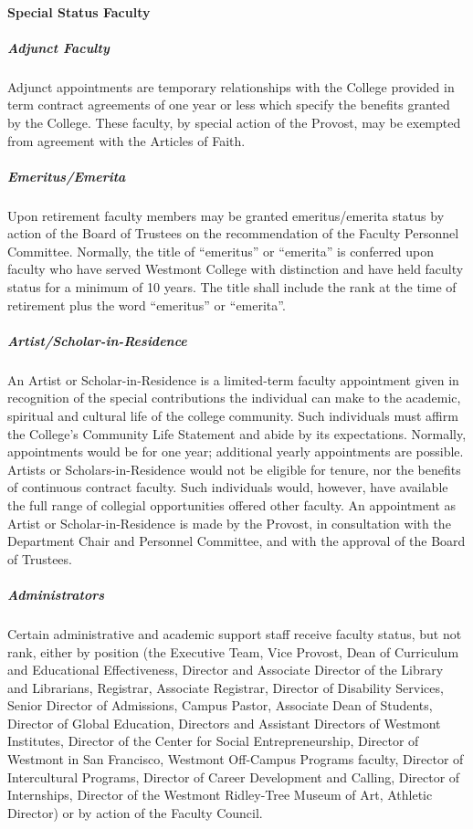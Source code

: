 			\paragraph{Special Status Faculty}
				\subparagraph{Adjunct Faculty}
					Adjunct appointments are temporary relationships with the College provided in term contract agreements of one year or less which specify the benefits granted by the College. These faculty, by special action of the Provost, may be exempted from agreement with the Articles of Faith.
				\subparagraph{Emeritus/Emerita}
					Upon retirement faculty members may be granted emeritus/emerita status by action of the Board of Trustees on the recommendation of the Faculty Personnel Committee.  Normally, the title of ``emeritus'' or ``emerita'' is conferred upon faculty who have served Westmont College with distinction and have held faculty status for a minimum of 10 years.  The title shall include the rank at the time of retirement plus the word ``emeritus'' or ``emerita''.
				\subparagraph{Artist/Scholar-in-Residence}
					An Artist or Scholar-in-Residence is a limited-term faculty appointment given in recognition of the special contributions the individual can make to the academic, spiritual and cultural life of the college community.  Such individuals must affirm the College's Community Life Statement and abide by its expectations.  Normally, appointments would be for one year; additional yearly appointments are possible.  Artists or Scholars-in-Residence would not be eligible for tenure, nor the benefits of continuous contract faculty. Such individuals would, however, have available the full range of collegial opportunities offered other faculty.  An appointment as Artist or Scholar-in-Residence is made by the Provost, in consultation with the Department Chair and Personnel Committee, and with the approval of the Board of Trustees.
				\subparagraph{Administrators}
					\label{sec:SpecialStatusFaculty-Administrators}
					Certain administrative and academic support staff receive faculty status, but not rank, either by position (the Executive Team, Vice Provost, Dean of Curriculum and Educational Effectiveness, Director and Associate Director of the Library and Librarians, Registrar, Associate Registrar, Director of Disability Services, Senior Director of Admissions, Campus Pastor, Associate Dean of Students, Director of Global Education, Directors and Assistant Directors of Westmont Institutes, Director of the Center for Social Entrepreneurship, Director of Westmont in San Francisco, Westmont Off-Campus Programs faculty, Director of Intercultural Programs, Director of Career Development and Calling, Director of Internships, Director of the Westmont Ridley-Tree Museum of Art, Athletic Director) or by action of the Faculty Council.
